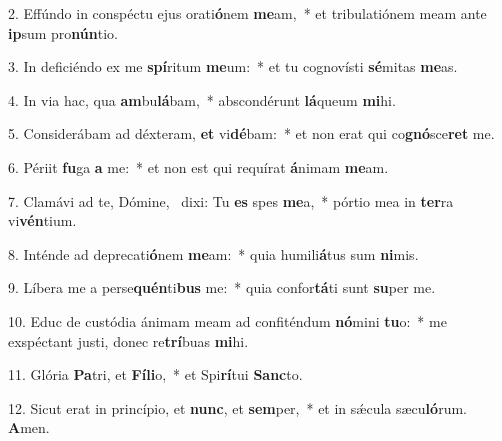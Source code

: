 2. Effúndo in conspéctu ejus orati\textbf{ó}nem \textbf{me}am,~*  et tribulatiónem meam ante \textbf{ip}sum pro\textbf{nún}tio.\

3. In deficiéndo ex me \textbf{spí}ritum \textbf{me}um:~*  et tu cognovísti \textbf{sé}mitas \textbf{me}as.\

4. In via hac, qua \textbf{am}bu\textbf{lá}bam,~*  abscondérunt \textbf{lá}queum \textbf{mi}hi.\

5. Considerábam ad déxteram, \textbf{et} vi\textbf{dé}bam:~*  et non erat qui co\textbf{gnó}sce\textbf{ret} me.\

6. Périit \textbf{fu}ga \textbf{a} me:~*  et non est qui requírat \textbf{á}nimam \textbf{me}am.\

7. Clamávi ad te, Dómine, \dag\  dixi: Tu \textbf{es} spes \textbf{me}a,~*  pórtio mea in \textbf{ter}ra vi\textbf{vén}tium.\

8. Inténde ad deprecati\textbf{ó}nem \textbf{me}am:~*  quia humili\textbf{á}tus sum \textbf{ni}mis.\

9. Líbera me a perse\textbf{quén}ti\textbf{bus} me:~*  quia confor\textbf{tá}ti sunt \textbf{su}per me.\

10. Educ de custódia ánimam meam ad confiténdum \textbf{nó}mini \textbf{tu}o:~*  me exspéctant justi, donec re\textbf{trí}buas \textbf{mi}hi.\

11. Glória \textbf{Pa}tri, et \textbf{Fí}\textbf{li}o,~*  et Spi\textbf{rí}tui \textbf{Sanc}to.\

12. Sicut erat in princípio, et \textbf{nunc}, et \textbf{sem}per,~*  et in sǽcula sæcu\textbf{ló}rum. \textbf{A}men.\

